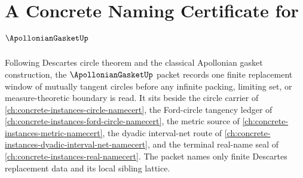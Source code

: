 \chapter{A Concrete Naming Certificate for $\ApollonianGasketUp$}
\label{ch:concrete-instances-apollonian-gasket-namecert}

Following Descartes circle theorem and the classical Apollonian gasket construction, the $\ApollonianGasketUp$ packet records one finite replacement window of mutually tangent circles before any infinite packing, limiting set, or measure-theoretic boundary is read. It sits beside the circle carrier of \autoref{ch:concrete-instances-circle-namecert}, the Ford-circle tangency ledger of \autoref{ch:concrete-instances-ford-circle-namecert}, the metric source of \autoref{ch:concrete-instances-metric-namecert}, the dyadic interval-net route of \autoref{ch:concrete-instances-dyadic-interval-net-namecert}, and the terminal real-name seal of \autoref{ch:concrete-instances-real-namecert}. The packet names only finite Descartes replacement data and its local sibling lattice.

